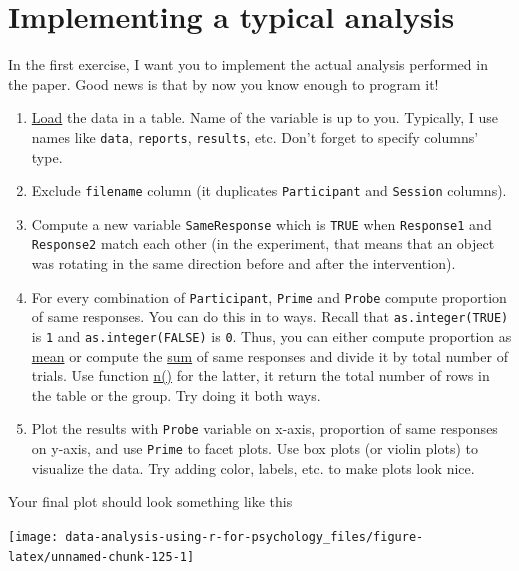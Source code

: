 \documentclass[
]{book}
\providecommand{\tightlist}{%
  \setlength{\itemsep}{0pt}\setlength{\parskip}{0pt}}
\begin{document}
\hypertarget{implementing-a-typical-analysis}{%
\section{Implementing a typical analysis}\label{implementing-a-typical-analysis}}

In the first exercise, I want you to implement the actual analysis performed in the paper. Good news is that by now you know enough to program it!

\begin{enumerate}
\def\labelenumi{\arabic{enumi}.}
\tightlist
\item
  \protect\hyperlink{readr}{Load} the data in a table. Name of the variable is up to you. Typically, I use names like \texttt{data}, \texttt{reports}, \texttt{results}, etc. Don't forget to specify columns' type.
\item
  Exclude \texttt{filename} column (it duplicates \texttt{Participant} and \texttt{Session} columns).
\item
  Compute a new variable \texttt{SameResponse} which is \texttt{TRUE} when \texttt{Response1} and \texttt{Response2} match each other (in the experiment, that means that an object was rotating in the same direction before and after the intervention).
\item
  For every combination of \texttt{Participant}, \texttt{Prime} and \texttt{Probe} compute proportion of same responses. You can do this in to ways. Recall that \texttt{as.integer(TRUE)} is \texttt{1} and \texttt{as.integer(FALSE)} is \texttt{0}. Thus, you can either compute proportion as \href{https://stat.ethz.ch/R-manual/R-patched/library/base/html/mean.html}{mean} or compute the \href{https://stat.ethz.ch/R-manual/R-patched/library/base/html/sum.html}{sum} of same responses and divide it by total number of trials. Use function \href{https://dplyr.tidyverse.org/reference/n.html}{n()} for the latter, it return the total number of rows in the table or the group. Try doing it both ways.
\item
  Plot the results with \texttt{Probe} variable on x-axis, proportion of same responses on y-axis, and use \texttt{Prime} to facet plots. Use box plots (or violin plots) to visualize the data. Try adding color, labels, etc. to make plots look nice.
\end{enumerate}

Your final plot should look something like this

\begin{center}\texttt{[image: data-analysis-using-r-for-psychology\_files/figure-latex/unnamed-chunk-125-1]} \end{center}
\end{document}
